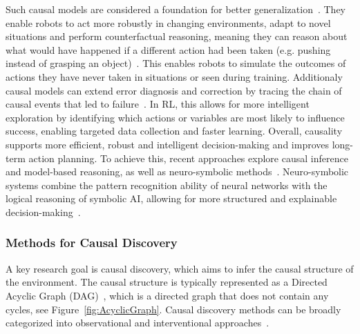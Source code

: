 Such causal models are considered a foundation for better generalization~\cite{Li2020CausalDI, Lee2024CausalRL}. They enable robots to act more robustly in changing environments, adapt to novel situations and perform counterfactual reasoning, meaning they can reason about what would have happened if a different action had been taken (e.g. pushing instead of grasping an object)~\cite{Lee2024CausalRL}. This enables robots to simulate the outcomes of actions they have never taken in situations or seen during training. Additionaly causal models can extend error diagnosis and correction by tracing the chain of causal events that led to failure~\cite{Lee2023SCALECL}. In \ac{RL}, this allows for more intelligent exploration by identifying which actions or variables are most likely to influence success, enabling targeted data collection and faster learning. Overall, causality supports more efficient, robust and intelligent decision-making and improves long-term action planning.
To achieve this, recent approaches explore causal inference and model-based reasoning, as well as neuro-symbolic methods~\cite{Eze2024LearningBW}. Neuro-symbolic systems combine the pattern recognition ability of neural networks with the logical reasoning of symbolic \ac{AI}, allowing for more structured and explainable decision-making~\cite{Garcez2020NeurosymbolicAT, Delong2023NeurosymbolicAF}.


\subsubsection{Methods for Causal Discovery}
A key research goal is causal discovery, which aims to infer the causal structure of the environment. The causal structure is typically represented as a Directed Acyclic Graph (DAG)~\cite{Li2022DeepCL}, which is a directed graph that does not contain any cycles, see Figure~\ref{fig:AcyclicGraph}. Causal discovery methods can be broadly categorized into observational and interventional approaches~\cite{Eze2024LearningBW}.

